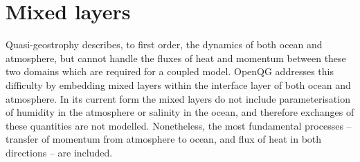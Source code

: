 \documentclass[11pt, a4paper,twoside]{article}
\numberwithin{equation}{section}
\begin{document}
\section{Mixed layers}\label{sec:mixed}
Quasi-geostrophy describes, to first order, the dynamics of both ocean and atmosphere, but cannot handle the fluxes of heat and momentum between these two domains which are required for a coupled model.
OpenQG addresses this difficulty by embedding mixed layers within the interface layer of both ocean and atmosphere.
In its current form the mixed layers do not include parameterisation of humidity in the atmosphere or salinity in the ocean, and therefore exchanges of these quantities are not modelled.
Nonetheless, the most fundamental processes -- transfer of momentum from atmosphere to ocean, and flux of heat in both directions -- are included.
\end{document}
